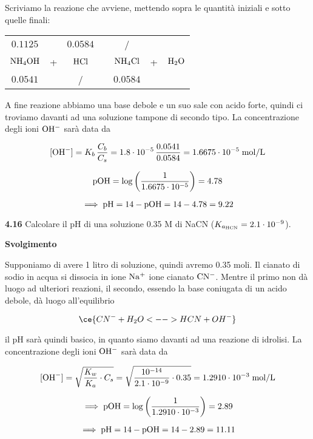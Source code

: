 Scriviamo la reazione che avviene, mettendo sopra le quantità iniziali e sotto quelle finali:

\begin{center}
    \begin{tabular}{ccccccc}
        $0.1125$ &  & $0.0584$ & & / &&\\
        $\rm NH_4OH$ & + & $\rm HCl$ & \ce{->} & $\rm NH_4Cl$ & + & $\rm H_2O$\\
        $0.0541$ &  & / & & $0.0584$ &&\\
    \end{tabular}
\end{center}

A fine reazione abbiamo una base debole e un suo sale con acido forte, quindi ci troviamo davanti ad una soluzione tampone di secondo tipo. La concentrazione degli ioni $\rm OH^-$ sarà data da

$$[\text{OH}^-]=K_b\,\frac{C_b}{C_s}
=1.8 \cdot 10^{-5}\,\frac{0.0541}{0.0584}
=1.6675 \cdot 10^{-5} \; \rm mol/L$$

$$\rm pOH=\log \left( \frac{1}{1.6675 \cdot 10^{-5}} \right)=4.78$$

$$\implies \rm pH=14-pOH=14-4.78=9.22$$

\vspace{0.2cm}\textbf{4.16} Calcolare il pH di una soluzione 0.35 M di NaCN ($K_{a_{\rm HCN}} = 2.1 \cdot 10^{-9}$).

\vspace{0.2cm}\large\textbf{Svolgimento}\normalsize

\vspace{0.2cm}Supponiamo di avere 1 litro di soluzione, quindi avremo 0.35 moli. Il cianato di sodio in acqua si dissocia in ione $\rm Na^+$ ione cianato $\rm CN^-$. Mentre il primo non dà luogo ad ulteriori reazioni, il secondo, essendo la base coniugata di un acido debole, dà luogo all'equilibrio

$$\ce{CN^- + H_2O <--> HCN + OH^-}$$

il pH sarà quindi basico, in quanto siamo davanti ad una reazione di idrolisi. La concentrazione degli ioni $\rm OH^-$ sarà data da


$$[\text{OH}^-]
=\sqrt{\frac{K_w}{K_a}\cdot C_s}
=\sqrt{\frac{10^{-14}}{2.1 \cdot 10^{-9}} \cdot 0.35}
=1.2910 \cdot 10^{-3} \; \rm mol/L$$

$$\implies \rm pOH
=\log{\left(\frac{1}{1.2910 \cdot 10^{-3}}\right)}
=2.89$$

$$\implies \rm pH=14-pOH=14-2.89=11.11$$


